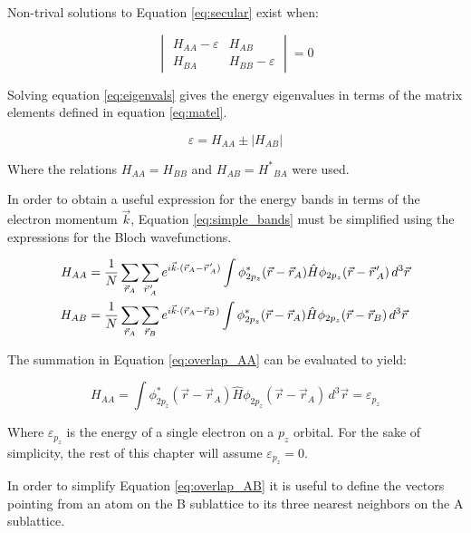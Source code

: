 Non-trival solutions to Equation \ref{eq:secular} exist when:

\begin{equation}
\label{eq:eigenvals}
    \begin{vmatrix} H_{AA}-\varepsilon & H_{AB} \\ H_{BA} & H_{BB}-\varepsilon \end{vmatrix} = 0
\end{equation}

Solving equation \ref{eq:eigenvals} gives the energy eigenvalues in terms of the matrix elements defined in equation \ref{eq:matel}.

\begin{equation}
\label{eq:simple_bands}
    \varepsilon = H_{AA} \pm \lvert H_{AB} \rvert
\end{equation}

Where the relations $H_{AA} = H_{BB}$ and $H_{AB} = {H^*}_{BA}$ were used.

In order to obtain a useful expression for the energy bands in terms of the electron momentum $\vec{k}$, Equation \ref{eq:simple_bands} must be simplified using the expressions for the Bloch wavefunctions. 

\begin{align}
    H_{AA} &= \frac{1}{N} \sum_{\vec{r}_A}^{} \sum_{\pvec{r}'_A}^{} e^{i \vec{k}\cdot(\vec{r}_A - \pvec{r}'_A)} \int \phi^*_{2p_z}(\vec{r}-\vec{r}_A) \hat{H} \phi_{2p_z}(\vec{r}-\pvec{r}'_A) \, d^3\vec{r} \label{eq:overlap_AA} \\
    H_{AB} &= \frac{1}{N} \sum_{\vec{r}_A}^{} \sum_{\vec{r}_B}^{} e^{i \vec{k}\cdot(\vec{r}_A - \vec{r}_B)} \int \phi^*_{2p_z}(\vec{r}-\vec{r}_A) \hat{H} \phi_{2p_z}(\vec{r}-\vec{r}_B) \, d^3\vec{r} \label{eq:overlap_AB}
\end{align}

The summation in Equation \ref{eq:overlap_AA} can be evaluated to yield:

\begin{equation}
\label{eq:pz_energy}
    H_{AA} = \int \phi^*_{2p_z}(\vec{r}-\vec{r}_A) \hat{H} \phi_{2p_z}(\vec{r}-\vec{r}_A) \, d^3\vec{r} = \varepsilon_{p_z}
\end{equation}

Where $\varepsilon_{p_z}$ is the energy of a single electron on a $p_z$ orbital. For the sake of simplicity, the rest of this chapter will assume $\varepsilon_{p_z} = 0$. 

In order to simplify Equation \ref{eq:overlap_AB} it is useful to define the vectors pointing from an atom on the B sublattice to its three nearest neighbors on the A sublattice.


